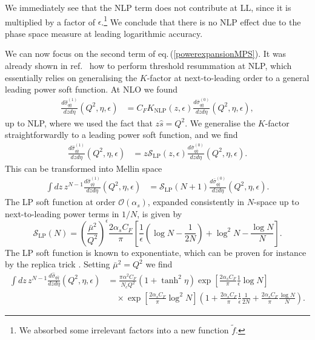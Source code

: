 \documentclass[11pt]{article}
\newcommand{\s}{\hat{s}}
\newcommand\eqn[1]     {eq.\,(\ref{#1})}
\begin{document}
We immediately see that the NLP term does not contribute at LL, since it is multiplied by a factor of $\epsilon$.\footnote{We absorbed some irrelevant factors into a new function $\tilde{f}$.} We conclude that there is no NLP effect due to the phase space measure at leading logarithmic accuracy. 

We can now focus on the second term of \eqn{powerexpansionMPS}. 
It was already shown in ref.~\cite{Bahjat-Abbas:2019fqa} how to perform threshold resummation at NLP, which essentially relies on generalising the $K$-factor at next-to-leading order to a general leading power soft function. At NLO we found
\begin{align}\label{eq:diffnloknlp}
    \frac{d\hat{\sigma}^{(1)}_{q\bar{q}}}{dzd\eta}(Q^2,\eta,\epsilon) &= C_FK_\text{NLP}(z,\epsilon)\frac{d\bar{\sigma}^{(0)}_{q\bar{q}}}{dzd\eta}(Q^2,\eta,\epsilon),
\end{align}
up to NLP, where we used the fact that $z\s = Q^2$. We generalise the $K$-factor straightforwardly to a leading power soft function, and we find
\begin{align}
    \frac{d\hat{\sigma}^{(1)}_{q\bar{q}}}{dzd\eta}(Q^2,\eta,\epsilon) &= z\mathcal{S}_\text{LP}(z,\epsilon)\frac{d\bar{\sigma}^{(0)}_{q\bar{q}}}{dzd\eta}(Q^2,\eta,\epsilon).
\end{align}
This can be transformed into Mellin space 
\begin{align}
    \int dz\, z^{N-1}\frac{d\hat{\sigma}^{(1)}_{q\bar{q}}}{dzd\eta}(Q^2,\eta,\epsilon) &= \mathcal{S}_\text{LP}(N+1)\frac{d\bar{\sigma}^{(0)}_{q\bar{q}}}{dzd\eta}(Q^2,\eta,\epsilon).
\end{align}
The LP soft function at order $\mathcal{O}(\alpha_s)$, expanded consistently in $N$-space up to next-to-leading power terms in $1/N$, is given by \cite{Bahjat-Abbas:2019fqa}
\begin{equation}
\mathcal{S}_\text{LP}(N) = \left(\frac{\bar{\mu}^2}{Q^2}\right)^\epsilon\frac{2\alpha_s C_F}{\pi}\left[\frac{1}{\epsilon}\left(\log N-\frac{1}{2N}\right)+\log^2N-\frac{\log N}{N}\right].
\end{equation}
The LP soft function is known to exponentiate, 
which can be proven for instance by 
the replica trick \cite{Gardi:2010rn}. 
Setting $\bar{\mu}^2=Q^2$ we find
\begin{align}
\int dz\, z^{N-1}\frac{d\hat{\sigma}_{q\bar{q}}}{dzd\eta}(Q^2,\eta,\epsilon) &= \frac{\pi\alpha^2C_F}{N_c Q^2}(1+\tanh^2\eta)\exp\left[\frac{2\alpha_sC_F}{\pi}\frac{1}{\epsilon}\log N\right]\nonumber \\
&\quad\times \exp\left[\frac{2\alpha_s C_F}{\pi}\log^2N\right]\left(1+\frac{2\alpha_sC_F}{\pi}\frac{1}{\epsilon}\frac{1}{2N}+\frac{2\alpha_sC_F}{\pi}\frac{\log N}{N}\right).
\end{align}
\end{document}
